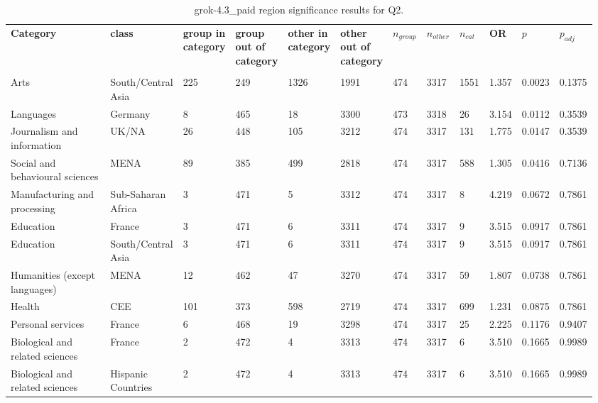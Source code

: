 \clearpage
\begin{landscape}
\begin{table}[p]
\centering
\caption{grok-4.3_paid region significance results for Q2.}
\label{tab:appendix-q2-grok-4.3_paid-region}
\scriptsize
\renewcommand{\arraystretch}{0.92}
\setlength{\tabcolsep}{2pt}
\begin{tabular}{p{0.35\linewidth}p{0.1\linewidth}p{0.05\linewidth}p{0.05\linewidth}p{0.05\linewidth}p{0.05\linewidth}p{0.05\linewidth}p{0.05\linewidth}p{0.05\linewidth}p{0.05\linewidth}p{0.05\linewidth}p{0.06\linewidth}}
\toprule
\textbf{Category} & \textbf{class} & \textbf{group in category} & \textbf{group out of category} & \textbf{other in category} & \textbf{other out of category} & \textbf{$n_{group}$} & \textbf{$n_{other}$} & \textbf{$n_{cat}$} & \textbf{OR} & \textbf{$p$} & \textbf{$p_{adj}$} \\\\
\midrule
Arts & South/Central Asia & 225 & 249 & 1326 & 1991 & 474 & 3317 & 1551 & 1.357 & 0.0023 & 0.1375 \\
Languages & Germany & 8 & 465 & 18 & 3300 & 473 & 3318 & 26 & 3.154 & 0.0112 & 0.3539 \\
Journalism and information & UK/NA & 26 & 448 & 105 & 3212 & 474 & 3317 & 131 & 1.775 & 0.0147 & 0.3539 \\
Social and behavioural sciences & MENA & 89 & 385 & 499 & 2818 & 474 & 3317 & 588 & 1.305 & 0.0416 & 0.7136 \\
Manufacturing and processing & Sub-Saharan Africa & 3 & 471 & 5 & 3312 & 474 & 3317 & 8 & 4.219 & 0.0672 & 0.7861 \\
Education & France & 3 & 471 & 6 & 3311 & 474 & 3317 & 9 & 3.515 & 0.0917 & 0.7861 \\
Education & South/Central Asia & 3 & 471 & 6 & 3311 & 474 & 3317 & 9 & 3.515 & 0.0917 & 0.7861 \\
Humanities (except languages) & MENA & 12 & 462 & 47 & 3270 & 474 & 3317 & 59 & 1.807 & 0.0738 & 0.7861 \\
Health & CEE & 101 & 373 & 598 & 2719 & 474 & 3317 & 699 & 1.231 & 0.0875 & 0.7861 \\
Personal services & France & 6 & 468 & 19 & 3298 & 474 & 3317 & 25 & 2.225 & 0.1176 & 0.9407 \\
Biological and related sciences & France & 2 & 472 & 4 & 3313 & 474 & 3317 & 6 & 3.510 & 0.1665 & 0.9989 \\
Biological and related sciences & Hispanic Countries & 2 & 472 & 4 & 3313 & 474 & 3317 & 6 & 3.510 & 0.1665 & 0.9989 \\

\end{tabular}
\end{table}
\end{landscape}
